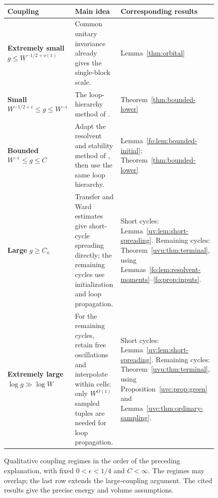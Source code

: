 \documentclass[11pt]{article}
\numberwithin{equation}{section}
\theoremstyle{remark}
\begin{document}
\begin{figure}[!t]
\centering
\renewcommand{\arraystretch}{1.35}
\fontsize{8.5}{10.5}\selectfont
\begin{tabularx}{\textwidth}{@{}p{}p{}X@{}}
\toprule
\textbf{Coupling} & \textbf{Main idea} & \textbf{Corresponding results}\\
\midrule
\textbf{Extremely small}\newline
$g\le W^{-1/2+o(1)}$
& Common unitary invariance already gives the single-block scale.
& Lemma~\ref{thm:orbital}\\[3pt]
\textbf{Small}\newline
$W^{-1/2+\epsilon}\le g\le W^{-\epsilon}$
& The loop-hierarchy method of \cite{TYY}.
& Theorem~\ref{thm:bounded-lower}\\[3pt]
\textbf{Bounded}\newline
$W^{-\epsilon}\le g\le C$
& Adapt the resolvent and stability method of \cite{DYYY}, then use the same loop hierarchy.
& Lemma~\ref{fo:lem:bounded-initial}; Theorem~\ref{thm:bounded-lower}\\[3pt]
\textbf{Large}\newline
$g\ge C_\kappa$
& Transfer and Ward estimates give short-cycle spreading directly; the remaining cycles use initialization and loop propagation.
& Short cycles: Lemma~\ref{uv:lem:short-spreading}.\newline
Remaining cycles: Theorem~\ref{uvu:thm:terminal}, using Lemmas~\ref{fo:lem:resolvent-moments}--\ref{fo:prop:inputs}.\\[3pt]
\textbf{Extremely large}\newline
$\log g\gg\log W$
& For the remaining cycles, retain free oscillations and interpolate within cells: only $W^{O(1)}$ sampled tuples are needed for loop propagation.
& Short cycles: Lemma~\ref{uv:lem:short-spreading}.\newline
Remaining cycles: Theorem~\ref{uvu:thm:terminal}, using Proposition~\ref{uvc:prop:green} and Lemma~\ref{uvc:thm:ordinary-sampling}.\\
\bottomrule
\end{tabularx}
\normalsize
\caption{Qualitative coupling regimes in the order of the preceding explanation,
with fixed $0<\epsilon<1/4$ and $C<\infty$.
The regimes may overlap; the last row extends the large-coupling argument.
The cited results give the precise energy and volume assumptions.}
\label{fig:lower-ranges}
\end{figure}
\end{document}
